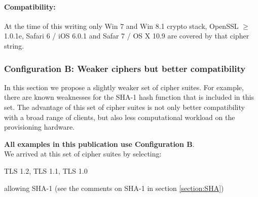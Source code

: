 
\paragraph*{Compatibility:}

At the time of this writing only Win 7 and Win 8.1 crypto stack,
OpenSSL $\ge$ 1.0.1e, Safari 6 / iOS 6.0.1 and Safar 7 / OS X 10.9
are covered by that cipher string.


\subsubsection{Configuration B: Weaker ciphers but better compatibility}

In this section we propose a slightly weaker set of cipher suites.  For
example, there are known weaknesses for the SHA-1 hash function that is
included in this set.  The advantage of this set of cipher suites is not only
better compatibility with a broad range of clients, but also less computational
workload on the provisioning hardware.


\textbf{All examples in this publication use Configuration B}.\\

We arrived at this set of cipher suites by selecting:

\begin{itemize*}
  \item TLS 1.2, TLS 1.1, TLS 1.0
  \item allowing SHA-1 (see the comments on SHA-1 in section \ref{section:SHA})
\end{itemize*}

